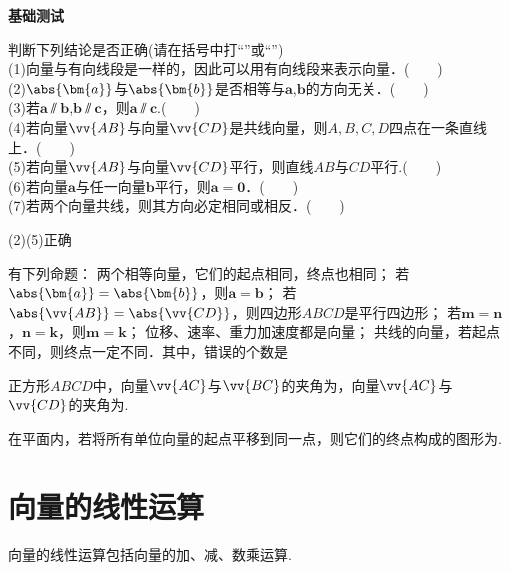   \begin{exercise}{\textbf{基础测试}}
    \item
      判断下列结论是否正确(请在括号中打“\checkmark”或“\XSolidBrush”)\\
      (1)向量与有向线段是一样的，因此可以用有向线段来表示向量．(　　)\\
      (2)$\abs{\bm{a}}$与$\abs{\bm{b}}$是否相等与$\bm{a}$,$\bm{b}$的方向无关．(　　)\\
      (3)若$\bm{a}\varparallel\bm{b}$,$\bm{b}\varparallel\bm{c}$，则$\bm{a}\varparallel\bm{c}$.(　　)\\
      (4)若向量$\vv{AB}$与向量$\vv{CD}$是共线向量，则$A,B,C,D$四点在一条直线上．(　　)\\
      (5)若向量$\vv{AB}$与向量$\vv{CD}$平行，则直线$AB$与$CD$平行.(　　)\\
      (6)若向量$\bm a$与任一向量$\bm b$平行，则$\bm a=\bm 0$．(　　)\\
      (7)若两个向量共线，则其方向必定相同或相反．(　　)
      \begin{answer}
        (2)(5)正确
      \end{answer}
    \item
      有下列命题：
      两个相等向量，它们的起点相同，终点也相同；
      若$\abs{\bm{a}}=\abs{\bm{b}}$，则$\bm{a}=\bm{b}$；
      若$\abs{\vv{AB}}=\abs{\vv{CD}}$，则四边形$ABCD$是平行四边形；
      若$\bm{m}=\bm{n}$，$\bm{n}=\bm{k}$，则$\bm{m}=\bm{k}$；
      位移、速率、重力加速度都是向量；
      共线的向量，若起点不同，则终点一定不同．其中，错误的个数是\xz
    \item
      正方形$ABCD$中，向量$\vv{AC}$与$\vv{BC}$的夹角为\tk，向量$\vv{AC}$与$\vv{CD}$的夹角为\tk.
    \item
      在平面内，若将所有单位向量的起点平移到同一点，则它们的终点构成的图形为\tk.
  \end{exercise}
\section{向量的线性运算}
  向量的线性运算包括向量的加、减、数乘运算.
